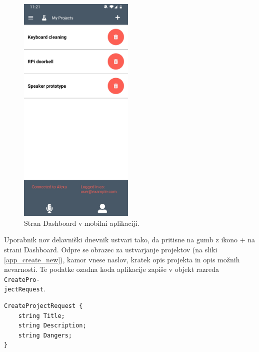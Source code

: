 \documentclass[a4paper, 12pt]{book}
\begin{document}
\begin{figure}[H]
\begin{center}
\includegraphics[width=5.5cm]{app_alexa_yes_small}
\end{center}
	\caption{Stran Dashboard v mobilni aplikaciji.}
\label{app_dashboard_first}
\end{figure}




Uporabnik nov delavniški dnevnik ustvari tako, da pritisne na gumb z ikono + na strani Dashboard.
Odpre se obrazec za ustvarjanje projektov (na sliki \ref{app_create_new}), kamor vnese naslov, kratek opis projekta in opis možnih nevarnosti.
Te podatke ozadna koda aplikacije zapiše v objekt razreda \texttt{CreatePro-\\jectRequest}.

\begin{verbatim}
CreateProjectRequest { 
    string Title;  
    string Description; 
    string Dangers; 
} 
\end{verbatim}
\end{document}
